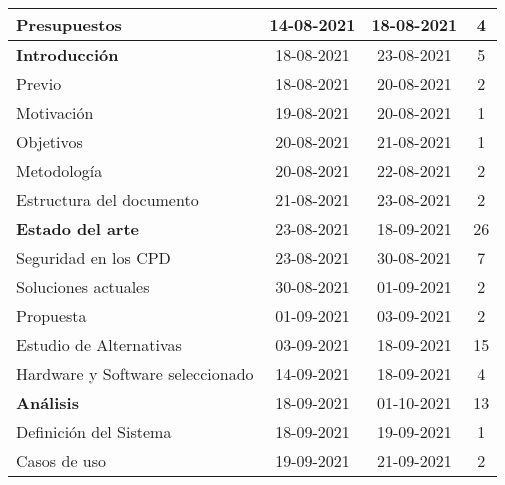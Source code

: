 \begin{longtable}[c]{lcc|c|}
	\multicolumn{1}{|l|}{Presupuestos}                       & \multicolumn{1}{c|}{14-08-2021} & 18-08-2021     & 4   \\ \hline
	\multicolumn{1}{|l|}{\textbf{Introducción}}              & \multicolumn{1}{c|}{18-08-2021} & 23-08-2021     & 5   \\ \hline
	\multicolumn{1}{|l|}{Previo}                             & \multicolumn{1}{c|}{18-08-2021} & 20-08-2021     & 2   \\ \hline
	\multicolumn{1}{|l|}{Motivación}                         & \multicolumn{1}{c|}{19-08-2021} & 20-08-2021     & 1   \\ \hline
	\multicolumn{1}{|l|}{Objetivos}                          & \multicolumn{1}{c|}{20-08-2021} & 21-08-2021     & 1   \\ \hline
	\multicolumn{1}{|l|}{Metodología}                        & \multicolumn{1}{c|}{20-08-2021} & 22-08-2021     & 2   \\ \hline
	\multicolumn{1}{|l|}{Estructura del documento}           & \multicolumn{1}{c|}{21-08-2021} & 23-08-2021     & 2   \\ \hline
	\multicolumn{1}{|l|}{\textbf{Estado del arte}}           & \multicolumn{1}{c|}{23-08-2021} & 18-09-2021     & 26  \\ \hline
	\multicolumn{1}{|l|}{Seguridad en los CPD}               & \multicolumn{1}{c|}{23-08-2021} & 30-08-2021     & 7   \\ \hline
	\multicolumn{1}{|l|}{Soluciones actuales}                & \multicolumn{1}{c|}{30-08-2021} & 01-09-2021     & 2   \\ \hline
	\multicolumn{1}{|l|}{Propuesta}                          & \multicolumn{1}{c|}{01-09-2021} & 03-09-2021     & 2   \\ \hline
	\multicolumn{1}{|l|}{Estudio de Alternativas}            & \multicolumn{1}{c|}{03-09-2021} & 18-09-2021     & 15  \\ \hline
	\multicolumn{1}{|l|}{Hardware y Software   seleccionado} & \multicolumn{1}{c|}{14-09-2021} & 18-09-2021     & 4   \\ \hline
	\multicolumn{1}{|l|}{\textbf{Análisis}}                  & \multicolumn{1}{c|}{18-09-2021} & 01-10-2021     & 13  \\ \hline
	\multicolumn{1}{|l|}{Definición del Sistema}             & \multicolumn{1}{c|}{18-09-2021} & 19-09-2021     & 1   \\ \hline
	\multicolumn{1}{|l|}{Casos de uso}                       & \multicolumn{1}{c|}{19-09-2021} & 21-09-2021     & 2   \\ \hline

\end{longtable}
